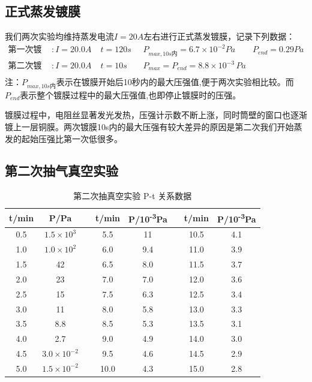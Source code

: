 \documentclass[12pt]{article}
\begin{document}
\subsection{正式蒸发镀膜}
我们两次实验均维持蒸发电流$I=20A$左右进行正式蒸发镀膜，记录下列数据：
\begin{equation*}
\begin{aligned}
    \text{第一次镀膜} &: I=20.0A \; & t = 120s \;&  \;P_{max,10s\text{内}}=6.7\times 10^{-2}Pa  & P_{end} = 0.29Pa \\
    \text{第二次镀膜} &: I=20.0A \; & t = 10s \;\;\;&  \;P_{max}=P_{end} = 8.8\times 10^{-3}\,Pa & \\
\end{aligned}
\end{equation*}
\footnotesize{注：$P_{max,10s\text{内}}$表示在镀膜开始后10秒内的最大压强值,便于两次实验相比较。而$P_{end}$表示整个镀膜过程中的最大压强值,也即停止镀膜时的压强。}
\vspace{1em}
\par
\normalsize{
镀膜过程中，电阻丝显著发光发热，压强计示数不断上涨，同时筒壁的窗口也逐渐镀上一层铜膜。两次镀膜10s内的最大压强有较大差异的原因是第二次我们开始蒸发的起始压强比第一次低很多。
}
\subsection{第二次抽气真空实验}
\begin{table}[H]
\centering
\caption{第二次抽真空实验 P-t 关系数据}
\label{tab:pt-data-second}
\begin{tabular}{cc c cc c cc}
\toprule
\textbf{t/min} & \textbf{P/Pa} & \phantom{abc} & \textbf{t/min} & \textbf{P/10\textsuperscript{-3}Pa} & \phantom{abc} & \textbf{t/min} & \textbf{P/10\textsuperscript{-3}Pa} \\
\midrule

0.5 & $1.5\times 10^{3} $&& 5.5 & 11   && 10.5 & 4.1 \\
1.0 & $1.0\times 10^{2} $ && 6.0 & 9.4  && 11.0 & 3.9 \\
1.5 & 42   && 6.5 & 8.0  && 11.5 & 3.7 \\
2.0 & 23   && 7.0 & 7.0  && 12.0 & 3.6 \\
2.5 & 15   && 7.5 & 6.3  && 12.5 & 3.4 \\
3.0 & 11   && 8.0 & 5.8  && 13.0 & 3.3 \\
3.5 & 8.8  && 8.5 & 5.3  && 13.5 & 3.1 \\
4.0 & 2.7  && 9.0 & 4.9  && 14.0 & 3.0 \\
4.5 & $3.0 \times 10^{-2}$ && 9.5 & 4.6  && 14.5 & 2.9 \\
5.0 & $1.5 \times 10^{-2}$ && 10.0 & 4.3 && 15.0 & 2.8 \\

\bottomrule
\end{tabular}
\end{table}
\end{document}
